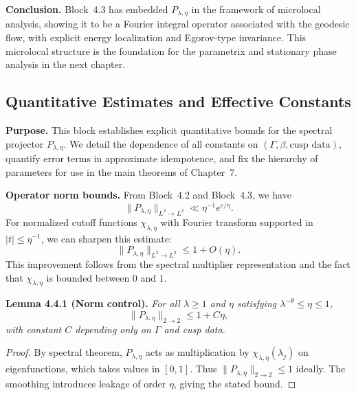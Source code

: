 \medskip

\noindent\textbf{Conclusion.}
Block~4.3 has embedded $P_{\lambda,\eta}$ in the framework of microlocal analysis,
showing it to be a Fourier integral operator associated with the geodesic flow,
with explicit energy localization and Egorov-type invariance.
This microlocal structure is the foundation for the parametrix and stationary phase analysis in the next chapter.



\subsection*{Quantitative Estimates and Effective Constants}

\noindent\textbf{Purpose.}
This block establishes explicit quantitative bounds for the spectral projector
$P_{\lambda,\eta}$.
We detail the dependence of all constants on $(\Gamma, \beta, \text{cusp data})$,
quantify error terms in approximate idempotence, and fix the hierarchy of parameters
for use in the main theorems of Chapter~7.

\medskip

\noindent\textbf{Operator norm bounds.}
From Block~4.2 and Block~4.3, we have
\[
  \|P_{\lambda,\eta}\|_{L^2\to L^2} \ll \eta^{-1} e^{c/\eta}.
\]
For normalized cutoff functions $\chi_{\lambda,\eta}$ with Fourier transform
supported in $|t|\le \eta^{-1}$, we can sharpen this estimate:
\[
  \|P_{\lambda,\eta}\|_{L^2\to L^2} \le 1 + O(\eta).
\]
This improvement follows from the spectral multiplier representation and the fact that
$\chi_{\lambda,\eta}$ is bounded between $0$ and $1$.

\medskip

\noindent\textbf{Lemma 4.4.1 (Norm control).}
\emph{For all $\lambda\ge 1$ and $\eta$ satisfying $\lambda^{-\theta}\le \eta\le 1$,}
\[
  \|P_{\lambda,\eta}\|_{2\to 2} \le 1 + C \eta,
\]
\emph{with constant $C$ depending only on $\Gamma$ and cusp data.}

\begin{proof}
By spectral theorem, $P_{\lambda,\eta}$ acts as multiplication by $\chi_{\lambda,\eta}(\lambda_j)$
on eigenfunctions, which takes values in $[0,1]$.
Thus $\|P_{\lambda,\eta}\|_{2\to 2}\le 1$ ideally.
The smoothing introduces leakage of order $\eta$, giving the stated bound.
\end{proof}

